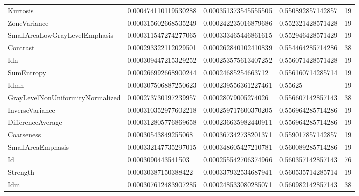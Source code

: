 {\begin{xltabular}[H]{\textwidth}{X l l l r}
    Kurtosis                               & \num{0.000474110119530288} & \num{0.000351373545555505} & \num{0.550892857142857} & 19\\
    ZoneVariance                           & \num{0.000315602668535249} & \num{0.000242235016879686} & \num{0.552321428571428} & 19\\
    SmallAreaLowGrayLevelEmphasis          & \num{0.000311547274277065} & \num{0.000333465446861615} & \num{0.552946428571429} & 19\\
    Contrast                               & \num{0.000293322112029501} & \num{0.000262840102410839} & \num{0.554464285714286} & 38\\
    Idn                                    & \num{0.000309447215329252} & \num{0.000253575613407252} & \num{0.556071428571428} & 19\\
    SumEntropy                             & \num{0.000266992668900244} & \num{0.00024685254663712}  & \num{0.556160714285714} & 19\\
    Idmn                                   & \num{0.000307506887250623} & \num{0.000239556361227461} & \num{0.55625} & 19\\
    GrayLevelNonUniformityNormalized       & \num{0.000273730197239957} & \num{0.00028079005274026}  & \num{0.556607142857143} & 38\\
    InverseVariance                        & \num{0.000310352977602218} & \num{0.000259717600370205} & \num{0.556964285714286} & 19\\
    DifferenceAverage                      & \num{0.000312805776869658} & \num{0.000236635982440911} & \num{0.556964285714286} & 19\\
    Coarseness                             & \num{0.00030543849255068}  & \num{0.000367342738201371} & \num{0.559017857142857} & 19\\
    SmallAreaEmphasis                      & \num{0.000332147735297015} & \num{0.000348605427210781} & \num{0.560089285714286} & 19\\
    Id                                     & \num{0.0003090443541503}   & \num{0.000255542706374966} & \num{0.560357142857143} & 76\\
    Strength                               & \num{0.00030387150388422}  & \num{0.000337932534687941} & \num{0.560535714285714} & 19\\
    Idm                                    & \num{0.000307612483907285} & \num{0.000248533080285071} & \num{0.560982142857143} & 38\\

\end{xltabular}}
